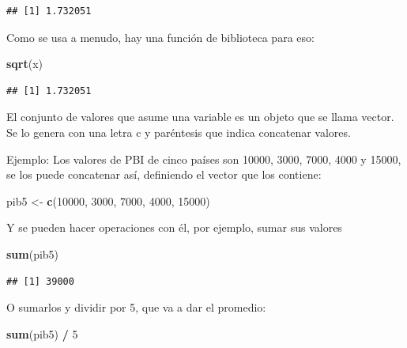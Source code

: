 \documentclass[]{book}
\newenvironment{Shaded}{\begin{snugshade}}{\end{snugshade}}
\newcommand{\DecValTok}[1]{\textcolor[rgb]{0.00,0.00,0.81}{#1}}
\newcommand{\KeywordTok}[1]{\textcolor[rgb]{0.13,0.29,0.53}{\textbf{#1}}}
\newcommand{\NormalTok}[1]{#1}
\newcommand{\OperatorTok}[1]{\textcolor[rgb]{0.81,0.36,0.00}{\textbf{#1}}}
\newcommand{\StringTok}[1]{\textcolor[rgb]{0.31,0.60,0.02}{#1}}
\begin{document}
\begin{verbatim}
## [1] 1.732051
\end{verbatim}

Como se usa a menudo, hay una función de biblioteca para eso:

\begin{Shaded}
\begin{Highlighting}[]
\KeywordTok{sqrt}\NormalTok{(x)}
\end{Highlighting}
\end{Shaded}

\begin{verbatim}
## [1] 1.732051
\end{verbatim}

El conjunto de valores que asume una variable es un objeto que se llama vector. Se lo genera con una letra c y paréntesis que indica concatenar valores.

Ejemplo: Los valores de PBI de cinco países son 10000, 3000, 7000, 4000 y 15000, se los puede concatenar así, definiendo el vector que los contiene:

\begin{Shaded}
\begin{Highlighting}[]
\NormalTok{pib5 <-}\StringTok{ }\KeywordTok{c}\NormalTok{(}\DecValTok{10000}\NormalTok{, }\DecValTok{3000}\NormalTok{, }\DecValTok{7000}\NormalTok{, }\DecValTok{4000}\NormalTok{, }\DecValTok{15000}\NormalTok{)}
\end{Highlighting}
\end{Shaded}

Y se pueden hacer operaciones con él, por ejemplo, sumar sus valores

\begin{Shaded}
\begin{Highlighting}[]
\KeywordTok{sum}\NormalTok{(pib5)}
\end{Highlighting}
\end{Shaded}

\begin{verbatim}
## [1] 39000
\end{verbatim}

O sumarlos y dividir por 5, que va a dar el promedio:

\begin{Shaded}
\begin{Highlighting}[]
\KeywordTok{sum}\NormalTok{(pib5) }\OperatorTok{/}\StringTok{ }\DecValTok{5}
\end{Highlighting}
\end{Shaded}
\end{document}
